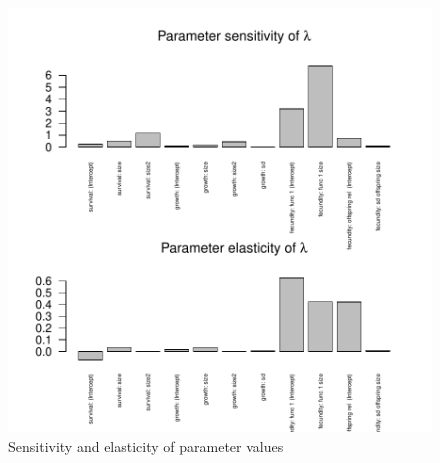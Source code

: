 \documentclass{article}
\begin{document}
\begin{figure}
\begin{center}
\includegraphics{IPMpack_Vignette-fig4a}
\end{center}
\caption{Sensitivity and elasticity of parameter values}
\label{fig:foura}
\end{figure}
\end{document}
